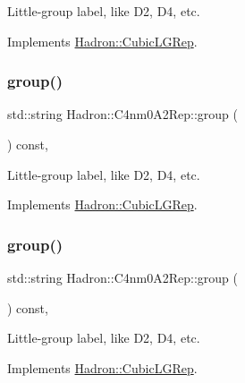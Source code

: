 Little-\/group label, like D2, D4, etc. 

Implements \mbox{\hyperlink{structHadron_1_1CubicLGRep_a9bdb14b519a611d21379ed96a3a9eb41}{Hadron\+::\+Cubic\+L\+G\+Rep}}.

\mbox{\label{structHadron_1_1C4nm0A2Rep_aaba4ff31952a682fa280fc4c8803dbc3}} 
\subsubsection{\texorpdfstring{group()}{group()}\hspace{0.1cm}{\footnotesize\ttfamily [3/5]}}
{\footnotesize\ttfamily std\+::string Hadron\+::\+C4nm0\+A2\+Rep\+::group (\begin{DoxyParamCaption}{ }\end{DoxyParamCaption}) const\hspace{0.3cm}{\ttfamily [inline]}, {\ttfamily [virtual]}}

Little-\/group label, like D2, D4, etc. 

Implements \mbox{\hyperlink{structHadron_1_1CubicLGRep_a9bdb14b519a611d21379ed96a3a9eb41}{Hadron\+::\+Cubic\+L\+G\+Rep}}.

\mbox{\label{structHadron_1_1C4nm0A2Rep_aaba4ff31952a682fa280fc4c8803dbc3}} 
\subsubsection{\texorpdfstring{group()}{group()}\hspace{0.1cm}{\footnotesize\ttfamily [4/5]}}
{\footnotesize\ttfamily std\+::string Hadron\+::\+C4nm0\+A2\+Rep\+::group (\begin{DoxyParamCaption}{ }\end{DoxyParamCaption}) const\hspace{0.3cm}{\ttfamily [inline]}, {\ttfamily [virtual]}}

Little-\/group label, like D2, D4, etc. 

Implements \mbox{\hyperlink{structHadron_1_1CubicLGRep_a9bdb14b519a611d21379ed96a3a9eb41}{Hadron\+::\+Cubic\+L\+G\+Rep}}.

\mbox{\label{structHadron_1_1C4nm0A2Rep_aaba4ff31952a682fa280fc4c8803dbc3}} 
